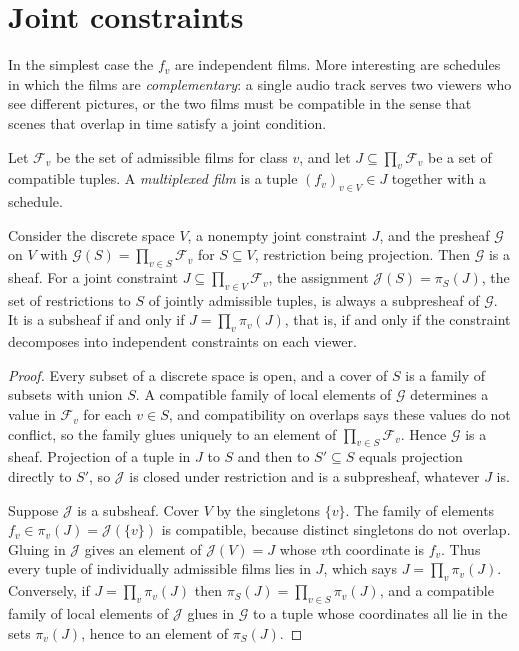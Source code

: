 \section{Joint constraints}

In the simplest case the $f_v$ are independent films. More interesting are schedules in which the films are \emph{complementary}: a single audio track serves two viewers who see different pictures, or the two films must be compatible in the sense that scenes that overlap in time satisfy a joint condition.

Let $\mathcal{F}_v$ be the set of admissible films for class $v$, and let $J\subseteq\prod_v\mathcal{F}_v$ be a set of compatible tuples. A \emph{multiplexed film} is a tuple $(f_v)_{v\in V}\in J$ together with a schedule.

\begin{proposition}\label{prop:sheafV}
Consider the discrete space $V$, a nonempty joint constraint $J$, and the presheaf $\mathcal{G}$ on $V$ with $\mathcal{G}(S)=\prod_{v\in S}\mathcal{F}_v$ for $S\subseteq V$, restriction being projection. Then $\mathcal{G}$ is a sheaf. For a joint constraint $J\subseteq\prod_{v\in V}\mathcal{F}_v$, the assignment $\mathcal{J}(S)=\pi_S(J)$, the set of restrictions to $S$ of jointly admissible tuples, is always a subpresheaf of $\mathcal{G}$. It is a subsheaf if and only if $J=\prod_v\pi_v(J)$, that is, if and only if the constraint decomposes into independent constraints on each viewer.
\end{proposition}

\begin{proof}
Every subset of a discrete space is open, and a cover of $S$ is a family of subsets with union $S$. A compatible family of local elements of $\mathcal{G}$ determines a value in $\mathcal{F}_v$ for each $v\in S$, and compatibility on overlaps says these values do not conflict, so the family glues uniquely to an element of $\prod_{v\in S}\mathcal{F}_v$. Hence $\mathcal{G}$ is a sheaf. Projection of a tuple in $J$ to $S$ and then to $S'\subseteq S$ equals projection directly to $S'$, so $\mathcal{J}$ is closed under restriction and is a subpresheaf, whatever $J$ is.

Suppose $\mathcal{J}$ is a subsheaf. Cover $V$ by the singletons $\{v\}$. The family of elements $f_v\in\pi_v(J)=\mathcal{J}(\{v\})$ is compatible, because distinct singletons do not overlap. Gluing in $\mathcal{J}$ gives an element of $\mathcal{J}(V)=J$ whose $v$th coordinate is $f_v$. Thus every tuple of individually admissible films lies in $J$, which says $J=\prod_v\pi_v(J)$. Conversely, if $J=\prod_v\pi_v(J)$ then $\pi_S(J)=\prod_{v\in S}\pi_v(J)$, and a compatible family of local elements of $\mathcal{J}$ glues in $\mathcal{G}$ to a tuple whose coordinates all lie in the sets $\pi_v(J)$, hence to an element of $\pi_S(J)$.
\end{proof}

